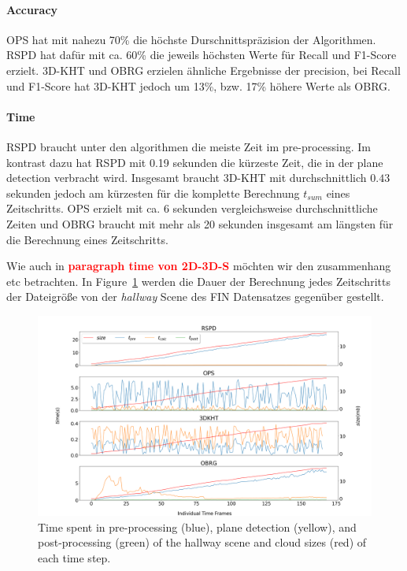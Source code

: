 \documentclass[main.tex]{subfiles}
\begin{document}
\paragraph{Accuracy}
OPS hat mit nahezu 70\% die höchste Durschnittspräzision der Algorithmen. RSPD hat dafür mit ca. 60\% die jeweils höchsten
Werte für Recall und F1-Score erzielt. 3D-KHT und OBRG erzielen ähnliche Ergebnisse der precision, bei Recall und
F1-Score hat 3D-KHT jedoch um 13\%, bzw. 17\% höhere Werte als OBRG.

\paragraph{Time}
RSPD braucht unter den algorithmen die meiste Zeit im pre-processing. Im kontrast dazu hat RSPD mit 0.19 sekunden
die kürzeste Zeit, die in der plane detection verbracht wird. Insgesamt braucht 3D-KHT mit durchschnittlich $0.43$
sekunden jedoch am kürzesten für die komplette Berechnung $t_{sum}$ eines Zeitschritts. OPS erzielt mit ca. 6 sekunden vergleichsweise
durchschnittliche Zeiten und OBRG braucht mit mehr als 20 sekunden insgesamt am längsten für die Berechnung
eines Zeitschritts.

Wie auch in \textbf{\textcolor{red}{paragraph time von 2D-3D-S}} möchten wir den zusammenhang etc betrachten.
In Figure~\ref{fig:dynhallway} werden die Dauer der Berechnung jedes Zeitschritts der Dateigröße von der
\textit{hallway} Scene des FIN Datensatzes gegenüber gestellt.

\begin{figure}[H]
    \centering
    \includegraphics[width=\textwidth]{images/dyn_time-hallway.png}
    \caption[Time Results Hallway]{Time spent in pre-processing (blue), plane detection (yellow), and post-processing
        (green) of the hallway scene and cloud sizes (red) of each time step. }
    \label{fig:dynhallway}
\end{figure}
\end{document}
